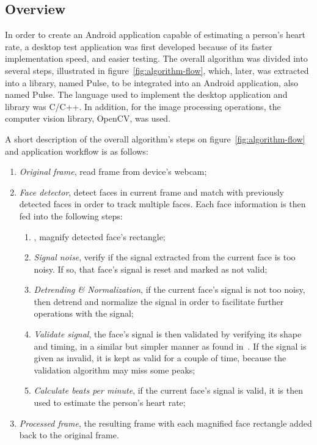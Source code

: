 \subsection{Overview} \label{sec:impl:overview}


In order to create an Android application capable of estimating a person's
heart rate, a desktop test application was first developed because of
its faster implementation speed, and easier testing.
The overall algorithm was divided into several steps, illustrated in
figure~\ref{fig:algorithm-flow}, which, later, was extracted into a
library, named Pulse, to be integrated into an Android application,
also named Pulse.
The language used to implement the desktop application and library
was C/C++. In addition, for the image processing operations, the
computer vision library, OpenCV, was used.

A short description of the overall algorithm's steps on
figure~\ref{fig:algorithm-flow} and application workflow is as follows:

\begin{enumerate}
  \item \emph{Original frame}, read frame from device's webcam;
  \item \emph{Face detector}, detect faces in current frame and match with
        previously detected faces in order to track multiple faces.
        Each face information is then fed into the following steps:
  \begin{enumerate}
    \item \emph{\evm}, magnify detected face's rectangle;
    \item \emph{Signal noise}, verify if the signal extracted from the
          current face is too noisy. If so, that face's signal is reset
          and marked as not valid;
    \item \emph{Detrending \& Normalization}, if the current face's signal is
          not too noisy, then detrend and normalize the signal in order to
          facilitate further operations with the signal;
    \item \emph{Validate signal}, the face's signal is then validated by
          verifying its shape and timing, in a similar but simpler manner as
          found in~\cite{Nenova2010Automated}. If the signal is given as
          invalid, it is kept as valid for a couple of time, because the
          validation algorithm may miss some peaks;
    \item \emph{Calculate beats per minute}, if the current face's signal is
          valid, it is then used to estimate the person's heart rate;
  \end{enumerate}
  \item \emph{Processed frame}, the resulting frame with each magnified face
        rectangle added back to the original frame.
\end{enumerate}

